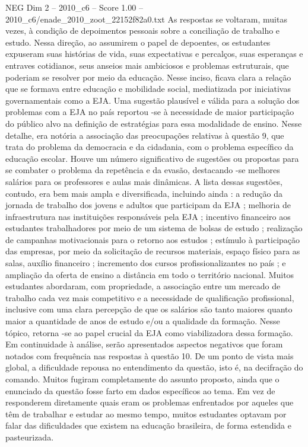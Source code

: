 \begin{textsample}{NEG Dim 2 – 2010\_c6 – Score 1.00 – 2010\_c6/enade\_2010\_zoot\_22152f82a0.txt}
As respostas se voltaram, muitas vezes, à condição de depoimentos pessoais sobre a conciliação de trabalho e estudo.
Nessa direção, ao assumirem o papel de depoentes, os estudantes expuseram suas histórias de vida, suas expectativas e percalços, suas esperanças e entraves cotidianos, seus anseios mais ambiciosos e problemas estruturais, que poderiam se resolver por meio da educação.
Nesse inciso, ficava clara a relação que se formava entre educação e mobilidade social, mediatizada por iniciativas governamentais como a EJA.
Uma sugestão plausível e válida para a solução dos problemas com a EJA no país reportou -se à necessidade de maior participação do público alvo na definição de estratégias para essa modalidade de ensino.
Nesse detalhe, era notória a associação das preocupações relativas à questão 9, que trata do problema da democracia e da cidadania, com o problema específico da educação escolar.
Houve um número significativo de sugestões ou propostas para se combater o problema da repetência e da evasão, destacando -se melhores salários para os professores e aulas mais dinâmicas.
A lista dessas sugestões, contudo, era bem mais ampla e diversificada, incluindo ainda : a redução da jornada de trabalho dos jovens e adultos que participam da EJA ; melhoria de infraestrutura nas instituições responsáveis pela EJA ; incentivo financeiro aos estudantes trabalhadores por meio de um sistema de bolsas de estudo ; realização de campanhas motivacionais para o retorno aos estudos ; estímulo à participação das empresas, por meio da solicitação de recursos materiais, espaço físico para as salas, auxílio financeiro ; incremento dos cursos profissionalizantes no país ; e ampliação da oferta de ensino a distância em todo o território nacional.
Muitos estudantes abordaram, com propriedade, a associação entre um mercado de trabalho cada vez mais competitivo e a necessidade de qualificação profissional, inclusive com uma clara percepção de que os salários são tanto maiores quanto maior a quantidade de anos de estudo e/ou a qualidade da formação.
Nesse tópico, retorna -se ao papel crucial da EJA como viabilizadora dessa formação.
Em continuidade à análise, serão apresentados aspectos negativos que foram notados com frequência nas respostas à questão 10.
De um ponto de vista mais global, a dificuldade repousa no entendimento da questão, isto é, na decifração do comando.
Muitos fugiram completamente do assunto proposto, ainda que o enunciado da questão fosse farto em dados específicos ao tema.
Em vez de responderem diretamente quais eram os problemas enfrentados por aqueles que têm de trabalhar e estudar ao mesmo tempo, muitos estudantes optavam por falar das dificuldades que existem na educação brasileira, de forma estendida e pasteurizada.

\end{textsample}
